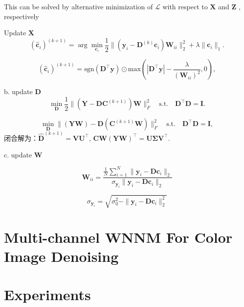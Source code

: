 \documentclass[10pt,twocolumn,letterpaper]{article}
\begin{document}
This can be solved by alternative minimization of $\mathcal{L}$ with respect to $\mathbf{X}$ and $\mathbf{Z}$ , respectively

Update $\mathbf{X}$
\begin{equation}
(\hat{\mathbf{c}}_{i})^{(k+1)}
=
\arg\min_{\mathbf{c}_{i}}\frac{1}{2}\|(\mathbf{y}_{i}-\mathbf{D}^{(k)}\mathbf{c}_{i})\mathbf{W}_{ii}\|_{2}^{2}
+
\lambda\|\mathbf{c}_{i}\|_{1}.
\end{equation}

\begin{equation}
(\hat{\mathbf{c}}_{i})^{(k+1)}
=
\text{sgn}(\mathbf{D^{\top}y}) 
\odot 
\text{max}(|\mathbf{D^{\top}y}|-\frac{\lambda}{(\mathbf{W}_{ii})^{2}},0),
\end{equation}

b. update $\mathbf{D}$
\begin{equation}
\min_{\mathbf{D}}\frac{1}{2}\|(\mathbf{Y}-\mathbf{D}\mathbf{C}^{(k+1)})\mathbf{W}\|_{F}^{2}
\quad
\text{s.t.}
\quad
\mathbf{D}^{\top}\mathbf{D} =\mathbf{I}. 
\end{equation}

\begin{equation}
\min_{\mathbf{D}}\|(\mathbf{Y}\mathbf{W})-\mathbf{D}(\mathbf{C}^{(k+1)}\mathbf{W})\|_{F}^{2}
\quad
\text{s.t.}
\quad
\mathbf{D}^{\top}\mathbf{D} = \mathbf{I},
\end{equation}
闭合解为：$\hat{\mathbf{D}}^{(k+1)}=\mathbf{V}\mathbf{U}^{\top}$, $\mathbf{C}\mathbf{W}(\mathbf{Y}\mathbf{W})^{\top}=\mathbf{U}\mathbf{\Sigma}\mathbf{V}^{\top}$.

c. update $\mathbf{W}$

\begin{equation}
\mathbf{W}_{ii} 
=\frac{\frac{1}{N}\sum_{i=1}^{N}\|\mathbf{y}_{i}-\mathbf{D}\mathbf{c}_{i}\|_{2}}{\sigma_{\mathbf{y}_{i}}\|\mathbf{y}_{i}-\mathbf{D}\mathbf{c}_{i}\|_{2}}
\end{equation}


\begin{equation}
\sigma_{\mathbf{y}_{i}} = \sqrt{\sigma_{0}^{2} - \|\mathbf{y}_{i}-\mathbf{D}\mathbf{c}_{i}\|_{2}^{2}}
\end{equation}



\section{Multi-channel WNNM For Color Image Denoising}


\section{Experiments}
\end{document}
